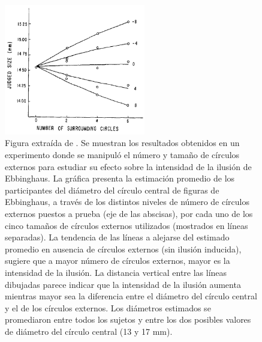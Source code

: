\begin{figure}[th]
\centering
\includegraphics[width=0.55\textwidth]{Figures/Ebb_Variables} 
\decoRule
\caption[Efecto del Numero y Tamaño de los círculos externos sobre la intensidad de la Ilusión de Ebbinghaus]{Figura extraída de \parencite{Massaro1971}. Se muestran los resultados obtenidos en un experimento donde se manipuló el número y tamaño de círculos externos para estudiar su efecto sobre la intensidad de la ilusión de Ebbinghaus. La gráfica presenta la estimación promedio de los participantes del diámetro del círculo central de figuras de Ebbinghaus, a través de los distintos niveles de número de círculos externos puestos a prueba (eje de las abscisas), por cada uno de los cinco tamaños de círculos externos utilizados (mostrados en líneas separadas). La tendencia de las líneas a alejarse del estimado promedio en ausencia de círculos externos (sin ilusión inducida), sugiere que a mayor número de círculos externos, mayor es la intensidad de la ilusión. La distancia vertical entre las líneas dibujadas parece indicar que la intensidad de la ilusión aumenta mientras mayor sea la diferencia entre el diámetro del círculo central y el de los círculos externos. Los diámetros estimados se promediaron entre todos los sujetos y entre los dos posibles valores de diámetro del círculo central (13 y 17 mm).}
\label{fig:Ebb_Var}
\end{figure}

